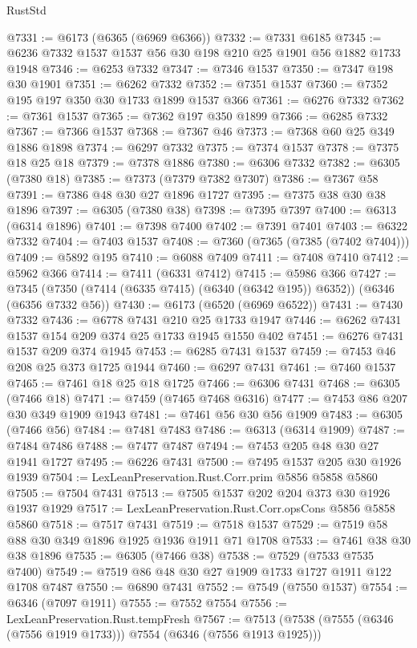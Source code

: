\begin{lexlean}{RustStd}
\begin{coremodule}
@7331 := @6173 (@6365 (@6969 @6366))
@7332 := @7331 @6185
@7345 := @6236 @7332 @1537 @1537 @56 @30 @198 @210 @25 @1901 @56 @1882 @1733 @1948
@7346 := @6253 @7332
@7347 := @7346 @1537
@7350 := @7347 @198 @30 @1901
@7351 := @6262 @7332
@7352 := @7351 @1537
@7360 := @7352 @195 @197 @350 @30 @1733 @1899 @1537 @366
@7361 := @6276 @7332
@7362 := @7361 @1537
@7365 := @7362 @197 @350 @1899
@7366 := @6285 @7332
@7367 := @7366 @1537
@7368 := @7367 @46
@7373 := @7368 @60 @25 @349 @1886 @1898
@7374 := @6297 @7332
@7375 := @7374 @1537
@7378 := @7375 @18 @25 @18
@7379 := @7378 @1886
@7380 := @6306 @7332
@7382 := @6305 (@7380 @18)
@7385 := @7373 (@7379 @7382 @7307)
@7386 := @7367 @58
@7391 := @7386 @48 @30 @27 @1896 @1727
@7395 := @7375 @38 @30 @38 @1896
@7397 := @6305 (@7380 @38)
@7398 := @7395 @7397
@7400 := @6313 (@6314 @1896)
@7401 := @7398 @7400
@7402 := @7391 @7401
@7403 := @6322 @7332
@7404 := @7403 @1537
@7408 := @7360 (@7365 (@7385 (@7402 @7404)))
@7409 := @5892 @195
@7410 := @6088 @7409
@7411 := @7408 @7410
@7412 := @5962 @366
@7414 := @7411 (@6331 @7412)
@7415 := @5986 @366
@7427 := @7345 (@7350 (@7414 (@6335 @7415) (@6340 (@6342 @195)) @6352)) (@6346 (@6356 @7332 @56))
@7430 := @6173 (@6520 (@6969 @6522))
@7431 := @7430 @7332
@7436 := @6778 @7431 @210 @25 @1733 @1947
@7446 := @6262 @7431 @1537 @154 @209 @374 @25 @1733 @1945 @1550 @402
@7451 := @6276 @7431 @1537 @209 @374 @1945
@7453 := @6285 @7431 @1537
@7459 := @7453 @46 @208 @25 @373 @1725 @1944
@7460 := @6297 @7431
@7461 := @7460 @1537
@7465 := @7461 @18 @25 @18 @1725
@7466 := @6306 @7431
@7468 := @6305 (@7466 @18)
@7471 := @7459 (@7465 @7468 @6316)
@7477 := @7453 @86 @207 @30 @349 @1909 @1943
@7481 := @7461 @56 @30 @56 @1909
@7483 := @6305 (@7466 @56)
@7484 := @7481 @7483
@7486 := @6313 (@6314 @1909)
@7487 := @7484 @7486
@7488 := @7477 @7487
@7494 := @7453 @205 @48 @30 @27 @1941 @1727
@7495 := @6226 @7431
@7500 := @7495 @1537 @205 @30 @1926 @1939
@7504 := LexLeanPreservation.Rust.Corr.prim @5856 @5858 @5860
@7505 := @7504 @7431
@7513 := @7505 @1537 @202 @204 @373 @30 @1926 @1937 @1929
@7517 := LexLeanPreservation.Rust.Corr.opsCons @5856 @5858 @5860
@7518 := @7517 @7431
@7519 := @7518 @1537
@7529 := @7519 @58 @88 @30 @349 @1896 @1925 @1936 @1911 @71 @1708
@7533 := @7461 @38 @30 @38 @1896
@7535 := @6305 (@7466 @38)
@7538 := @7529 (@7533 @7535 @7400)
@7549 := @7519 @86 @48 @30 @27 @1909 @1733 @1727 @1911 @122 @1708 @7487
@7550 := @6890 @7431
@7552 := @7549 (@7550 @1537)
@7554 := @6346 (@7097 @1911)
@7555 := @7552 @7554
@7556 := LexLeanPreservation.Rust.tempFresh
@7567 := @7513 (@7538 (@7555 (@6346 (@7556 @1919 @1733))) @7554 (@6346 (@7556 @1913 @1925)))

\end{coremodule}
\end{lexlean}
